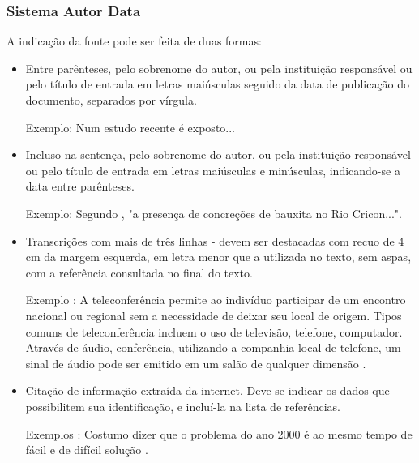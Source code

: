 \subsubsection{Sistema Autor Data}

A indicação da fonte pode ser feita de duas formas:

\begin{itemize}
  \item Entre parênteses, pelo sobrenome do autor, ou pela instituição responsável ou pelo título de entrada em letras maiúsculas seguido da data de publicação do documento, separados por vírgula.

  Exemplo: Num estudo recente \cite{Trainotti2014} é exposto...

  \item   Incluso na sentença, pelo sobrenome do autor, ou pela instituição responsável ou pelo título de entrada em letras maiúsculas e minúsculas, indicando-se a data entre parênteses.

  Exemplo: Segundo , "a presença de concreções de bauxita no Rio Cricon...".

  \item Transcrições com mais de três linhas - devem ser destacadas com recuo de 4 cm da margem esquerda, em letra menor que a utilizada no texto, sem aspas, com a referência consultada no final do texto.

  Exemplo : A teleconferência permite ao indivíduo participar de um encontro nacional ou regional sem a necessidade de deixar seu local de origem. Tipos comuns de teleconferência incluem o uso de televisão, telefone, computador. Através de áudio, conferência, utilizando a companhia local de telefone, um sinal de áudio pode ser emitido em um salão de qualquer dimensão \cite{Trainotti2014}.

  \item Citação de informação extraída da internet. Deve-se indicar os dados que possibilitem sua identificação, e incluí-la na lista de referências.

  Exemplos : Costumo dizer que o problema do ano 2000 é ao mesmo tempo de fácil e de difícil solução \cite{Internet2014}.

\end{itemize}
